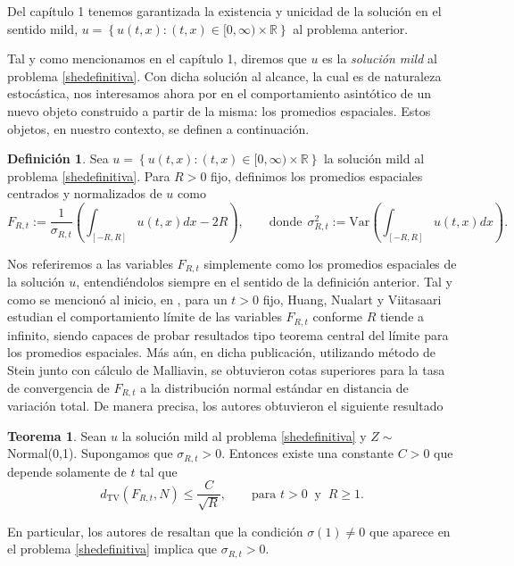 \documentclass[letterpaper,twoside,12pt]{book}
\newcommand{\R}{\mathbb{R}}
\newcommand{\1}{\mathds{1}}
\theoremstyle{definition}
\newtheorem{dfn}{Definición}
\theoremstyle{definition}
\newtheorem{teo}{Teorema}
\theoremstyle{remark}
\theoremstyle{definition}
\theoremstyle{definition}
\theoremstyle{definition}
\theoremstyle{definition}
\theoremstyle{definition}
\begin{document}
Del capítulo 1 tenemos garantizada la existencia y unicidad de la solución en el sentido mild, $u=\left\{u(t,x):(t,x)\in [0,\infty)\times\R\right\}$ al problema anterior. 

Tal y como mencionamos en el capítulo 1, diremos que $u$ es la \textit{solución mild} al problema \eqref{shedefinitiva}. Con dicha solución al alcance, la cual es de naturaleza estocástica, nos interesamos ahora por en el comportamiento asintótico de un nuevo objeto construido a partir de la misma: los promedios espaciales. Estos objetos, en nuestro contexto, se definen a continuación. 

\begin{dfn}\label{defpromediosespaciales}
 Sea $u=\left\{u(t,x):(t,x)\in [0,\infty)\times\R\right\}$ la solución mild al problema \eqref{shedefinitiva}. Para $R>0$ fijo, definimos los promedios espaciales centrados y normalizados de $u$ como 
 \begin{equation*}
   F_{R,t}:=\frac{1}{\sigma_{R,t}}\left(\int_{[-R,R]}u(t,x)dx -2R\right), \qquad \text{donde} \ \ \sigma^2_{R,t}:=\text{Var}\left(\int_{[-R,R]}u(t,x)dx\right).
\end{equation*}
 \end{dfn}
Nos referiremos a las variables $F_{R,t}$ simplemente como los promedios espaciales de la solución $u$, entendiéndolos siempre en el sentido de la definición anterior. Tal y como se mencionó al inicio, en \cite{HUANG20207170}, para un $t>0$ fijo, Huang, Nualart y Viitasaari estudian el comportamiento límite de las variables $F_{R,t}$ conforme $R$ tiende a infinito, siendo capaces de probar resultados tipo teorema central del límite para los promedios espaciales. Más aún, en dicha publicación, utilizando método de Stein junto con cálculo de Malliavin, se obtuvieron cotas superiores para la tasa de convergencia de $F_{R,t}$ a la distribución normal estándar en distancia de variación total. De manera precisa, los autores obtuvieron el siguiente resultado

\begin{teo} 
 Sean $u$ la solución mild al problema \eqref{shedefinitiva} y $Z\sim$ Normal(0,1). Supongamos que $\sigma_{R,t}>0$. Entonces existe una constante $C>0$ que depende solamente de $t$ tal que 
 \begin{equation}
    d_{\text{TV}}(F_{R,t},N)\leq \frac{C}{\sqrt{R}}, \qquad \text{para }t>0 \ \text{ y } \ R\geq1.  
 \end{equation}
 \end{teo}
En particular, los autores de \cite{HUANG20207170} resaltan que la condición $\sigma(1)\neq 0$ que aparece en el problema \eqref{shedefinitiva} implica que $\sigma_{R,t}>0$.
\end{document}
